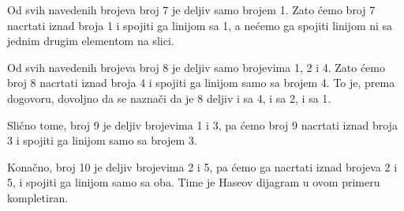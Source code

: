 \bigskip

\noindent
\begin{minipage}{3in}
  Od svih navedenih brojeva broj 7 je deljiv samo brojem 1. Zato \'cemo broj 7 nacrtati iznad broja 1 i spojiti ga linijom sa 1, a ne\'cemo
  ga spojiti linijom ni sa jednim drugim elementom na slici.
\end{minipage}
\hfill
\begin{minipage}{2.5in}
  \begin{center}
    
  \end{center}
\end{minipage}

\bigskip

\noindent
\begin{minipage}{3in}
  Od svih navedenih brojeva broj 8 je deljiv samo brojevima 1, 2 i 4. Zato \'cemo broj 8 nacrtati iznad broja 4 i spojiti ga linijom
  samo sa brojem 4. To je, prema dogovoru, dovoljno da se nazna\v ci da je 8 deljiv i sa 4, i sa 2, i sa 1.
\end{minipage}
\hfill
\begin{minipage}{2.5in}
  \begin{center}
    
  \end{center}
\end{minipage}

\bigskip

\noindent
\begin{minipage}{3in}
  Sli\v cno tome, broj 9 je deljiv brojevima 1 i 3, pa \'cemo broj 9 nacrtati iznad broja 3 i spojiti ga linijom
  samo sa brojem 3.
\end{minipage}
\hfill
\begin{minipage}{2.5in}
  \begin{center}
    
  \end{center}
\end{minipage}

\bigskip

\noindent
\begin{minipage}{3in}
  Kona\v cno, broj 10 je deljiv brojevima 2 i 5, pa \'cemo ga nacrtati iznad brojeva 2 i 5, i spojiti ga linijom
  samo sa oba. Time je Haseov dijagram u ovom primeru kompletiran.
\end{minipage}
\hfill
\begin{minipage}{2.5in}
  \begin{center}
    
  \end{center}
\end{minipage}

